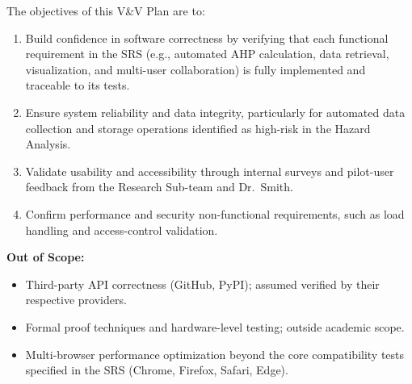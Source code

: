 \documentclass[12pt, titlepage]{article}
\begin{document}

The objectives of this V\&V Plan are to:

\begin{enumerate}
  \item Build confidence in software correctness by verifying that each
  functional requirement in the SRS (e.g., automated AHP calculation, data
  retrieval, visualization, and multi-user collaboration) is fully implemented
  and traceable to its tests.

  \item Ensure system reliability and data integrity, particularly for automated
  data collection and storage operations identified as high-risk in the Hazard
  Analysis.

  \item Validate usability and accessibility through internal surveys and
  pilot-user feedback from the Research Sub-team and Dr.~Smith.

  \item Confirm performance and security non-functional requirements, such as
  load handling and access-control validation.
\end{enumerate}

\textbf{Out of Scope:}
\begin{itemize}
  \item Third-party API correctness (GitHub, PyPI); assumed verified by their
  respective providers.

  \item Formal proof techniques and hardware-level testing; outside academic
  scope.

  \item Multi-browser performance optimization beyond the core compatibility
  tests specified in the SRS (Chrome, Firefox, Safari, Edge).
\end{itemize}
\end{document}
